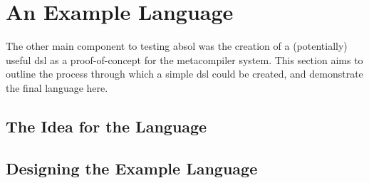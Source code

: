 


\section{An Example Language} %
\label{sec:an_example_language}
The other main component to testing \gls{absol} was the creation of a (potentially) useful \gls{dsl} as a proof-of-concept for the metacompiler system. 
This section aims to outline the process through which a simple \gls{dsl} could be created, and demonstrate the final language here. 

\subsection{The Idea for the Language} %
\label{sub:the_idea_for_the_language}



\subsection{Designing the Example Language} %
\label{sub:designing_the_example_language}



